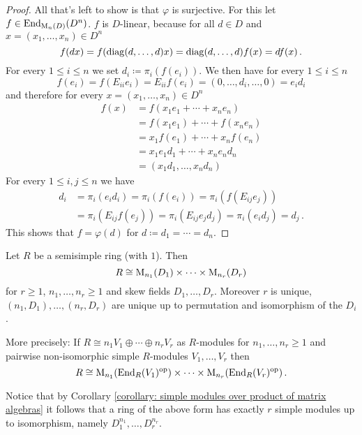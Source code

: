 \begin{proof}
  All that’s left to show is that $\varphi$ is surjective.
  For this let $f \in \operatorname{End}_{\operatorname{M}_n(D)}(D^n)$.
  $f$ is $D$-linear, because for all $d \in D$ and $x = (x_1, \dotsc, x_n) \in D^n$
  \[
      f(dx)
    = f( \operatorname{diag}(d, \dotsc, d) x)
    = \operatorname{diag}(d, \dotsc, d) f(x)
    = d f(x) \,.
  \]
  For every $1 \leq i \leq n$ we set $d_i \coloneqq \pi_i(f(e_i))$.
  We then have for every $1 \leq i \leq n$
  \[
      f(e_i)
    = f(E_{ii} e_i)
    = E_{ii} f(e_i)
    = (0, \dotsc, d_i, \dotsc, 0)
    = e_i d_i 
  \]
  and therefore for every $x = (x_1, \dotsc, x_n) \in D^n$
  \begin{align*}
        f(x)
    &=  f(x_1 e_1 + \dotsb + x_n e_n)       \\
    &=  f(x_1 e_1) + \dotsb + f(x_n e_n)    \\
    &=  x_1 f(e_1) + \dotsb + x_n f(e_n)    \\
    &=  x_1 e_1 d_1 + \dotsb + x_n e_n d_n  \\
    &=  (x_1 d_1, \dotsc, x_n d_n)
  \end{align*}
  For every $1 \leq i,j \leq n$ we have
  \begin{align*}
        d_i
    &=  \pi_i(e_i d_i)
     =  \pi_i(f(e_i))
     =  \pi_i(f(E_{ij} e_j)) \\
    &=  \pi_i(E_{ij} f(e_j))
     =  \pi_i(E_{ij} e_j d_j)
     =  \pi_i(e_i d_j)
     =  d_j \,.
  \end{align*}   
  This shows that $f = \varphi(d)$ for $d \coloneqq d_1 = \dotsb = d_n$.
\end{proof}


\begin{theorem}
  Let $R$ be a semisimple ring (with $1$). Then
  \[
    R \cong \operatorname{M}_{n_1}(D_1) \times \dotsb \times  \operatorname{M}_{n_r}(D_r)
  \]
  for $r \geq 1$, $n_1, \dotsc, n_r \geq 1$ and skew fields $D_1, \dotsc, D_r$.
  Moreover $r$ is unique, $(n_1,D_1), \dotsc, (n_r,D_r)$ are unique up to permutation and isomorphism of the $D_i$.
  
  More precisely:
  If $R \cong n_1 V_1 \oplus \dotsb \oplus n_r V_r$ as $R$-modules for $n_1, \dotsc, n_r \geq 1$ and pairwise non-isomorphic simple $R$-modules $V_1, \dotsc, V_r$ then
  \[
    R \cong \operatorname{M}_{n_1}(\operatorname{End}_R(V_1)^{\mathrm{op}}) \times \dotsb \times \operatorname{M}_{n_r}(\operatorname{End}_R(V_r)^{\mathrm{op}}) \,.
  \]
\end{theorem}


Notice that by Corollary \ref{corollary: simple modules over product of matrix algebras} it follows that a ring of the above form has exactly $r$ simple modules up to isomorphism, namely $D_1^{n_1}, \dotsc, D_r^{n_r}$.


